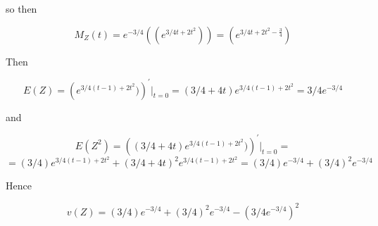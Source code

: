 \documentclass[11pt,largemargins]{homework}
\begin{document}
so then 

\[M_Z(t) = e^{-3/4}((e^{3/4t+2t^2})) = (e^{3/4t+2t^2 - \tfrac{3}{4}})\]

Then 

\[E(Z) = \left( e^{3/4(t-1) + 2t^2 })\right)^\prime \big|_{t = 0} = (3/4 + 4t)e^{3/4(t-1) + 2t^2} = 3/4e^{-3/4}\] 

and 

\[E(Z^2) = \left( (3/4 + 4t)e^{3/4(t-1) + 2t^2} ) \right)^\prime \big|_{t = 0} = \] 
\[=(3/4)e^{3/4(t-1) + 2t^2} + (3/4 + 4t)^2e^{3/4(t-1) + 2t^2} = (3/4)e^{-3/4} + (3/4)^2e^{-3/4}\]

Hence 

\[v(Z) = (3/4)e^{-3/4} + (3/4)^2e^{-3/4} - (3/4e^{-3/4})^2\]
\end{document}
